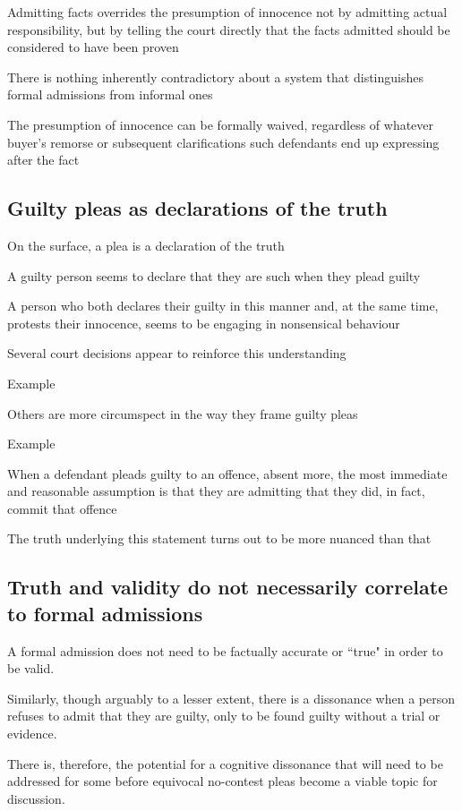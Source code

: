 Admitting facts overrides the presumption of innocence not by admitting actual responsibility, but by telling the court directly that the facts admitted should be considered to have been proven

There is nothing inherently contradictory about a system that distinguishes formal admissions from informal ones

The presumption of innocence can be formally waived, regardless of whatever buyer's remorse or subsequent clarifications such defendants end up expressing after the fact

\subsection{Guilty pleas as declarations of the truth}
On the surface, a plea is a declaration of the truth

A guilty person seems to declare that they are such when they plead guilty

A person who both declares their guilty in this manner and, at the same time, protests their innocence, seems to be engaging in nonsensical behaviour

Several court decisions appear to reinforce this understanding

Example

Others are more circumspect in the way they frame guilty pleas

Example

When a defendant pleads guilty to an offence, absent more, the most immediate and reasonable assumption is that they are admitting that they did, in fact, commit that offence

The truth underlying this statement turns out to be more nuanced than that

\subsection{Truth and validity do not necessarily correlate to formal admissions}

A formal admission does not need to be factually accurate or ``true" in order to be valid. 

Similarly, though arguably to a lesser extent, there is a dissonance when a person refuses to admit that they are guilty, only to be found guilty without a trial or evidence.

There is, therefore, the potential for a cognitive dissonance that will need to be addressed for some before equivocal no-contest pleas become a viable topic for discussion.

